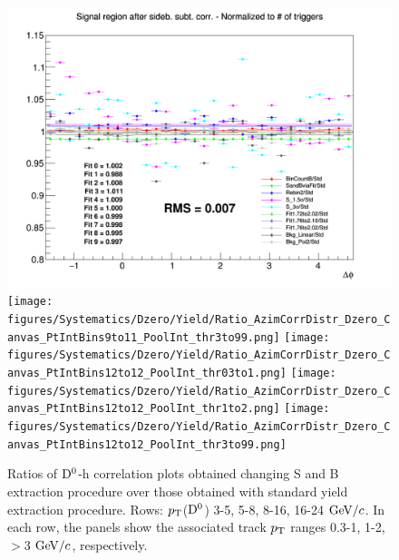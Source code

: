 \begin{figure}
{\includegraphics[width=0.31\linewidth]{figures/Systematics/Dzero/Yield/Ratio_AzimCorrDistr_Dzero_Canvas_PtIntBins9to11_PoolInt_thr1to2.png}}
{\texttt{[image: figures/Systematics/Dzero/Yield/Ratio\_AzimCorrDistr\_Dzero\_Canvas\_PtIntBins9to11\_PoolInt\_thr3to99.png]}}
{\texttt{[image: figures/Systematics/Dzero/Yield/Ratio\_AzimCorrDistr\_Dzero\_Canvas\_PtIntBins12to12\_PoolInt\_thr03to1.png]}}
{\texttt{[image: figures/Systematics/Dzero/Yield/Ratio\_AzimCorrDistr\_Dzero\_Canvas\_PtIntBins12to12\_PoolInt\_thr1to2.png]}}
{\texttt{[image: figures/Systematics/Dzero/Yield/Ratio\_AzimCorrDistr\_Dzero\_Canvas\_PtIntBins12to12\_PoolInt\_thr3to99.png]}}
 \caption{Ratios of ${\rm D^0}$-h correlation plots obtained changing S and B extraction procedure over those obtained with standard yield extraction procedure. Rows: $p_{\rm T}$(${\rm D^0}$) 3-5, 5-8, 8-16, 16-24 $\mathrm{GeV}/c$. In each row, the panels show the associated track $p_{\rm T}$ ranges 0.3-1, 1-2, $>$3 $\mathrm{GeV}/c$, respectively.}
\label{fig:Syst_D0Yield}
\end{figure}

